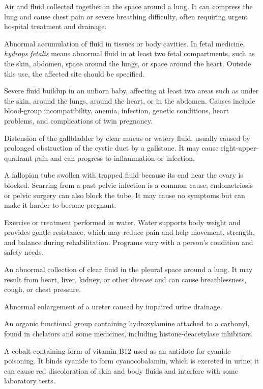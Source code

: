  Air and fluid collected together in the space around a lung. It can compress the lung and cause chest pain or severe breathing difficulty, often requiring urgent hospital treatment and drainage.

 Abnormal accumulation of fluid in tissues or body cavities. In fetal medicine, \textit{hydrops fetalis} means abnormal fluid in at least two fetal compartments, such as the skin, abdomen, space around the lungs, or space around the heart. Outside this use, the affected site should be specified.

 Severe fluid buildup in an unborn baby, affecting at least two areas such as under the skin, around the lungs, around the heart, or in the abdomen. Causes include blood-group incompatibility, anemia, infection, genetic conditions, heart problems, and complications of twin pregnancy.

 Distension of the gallbladder by clear mucus or watery fluid, usually caused by prolonged obstruction of the cystic duct by a gallstone. It may cause right-upper-quadrant pain and can progress to inflammation or infection.

 A fallopian tube swollen with trapped fluid because its end near the ovary is
blocked. Scarring from a past pelvic infection is a common cause; endometriosis or pelvic
surgery can also block the tube. It may cause no symptoms but can make it harder to become
pregnant.

 Exercise or treatment performed in water. Water supports body weight and provides gentle resistance, which may reduce pain and help movement, strength, and balance during rehabilitation. Programs vary with a person’s condition and safety needs.

 An abnormal collection of clear fluid in the pleural space around a lung. It may result from heart, liver, kidney, or other disease and can cause breathlessness, cough, or chest pressure.

 Abnormal enlargement of a ureter caused by impaired urine drainage.

 An organic functional group containing hydroxylamine attached to a carbonyl, found in chelators and some medicines, including histone-deacetylase inhibitors.

 A cobalt-containing form of vitamin B12 used as an antidote for cyanide poisoning. It
binds cyanide to form cyanocobalamin, which is excreted in urine; it can cause red
discoloration of skin and body fluids and interfere with some laboratory tests.

